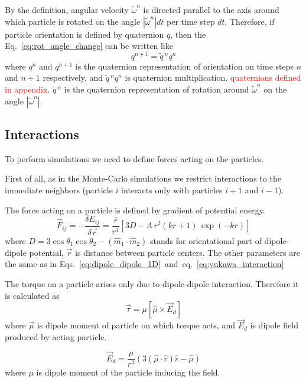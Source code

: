 By the definition, angular velocity $\tilde{\omega}^n$ is directed parallel to the axis around which particle is rotated on the angle $|\tilde{\omega}^n|dt$ per time step $dt$. Therefore, if particle orientation is defined by quaternion $q$, then the Eq.~\eqref{eq:rot_angle_change} can be written like
\begin{equation}
q^{n+1} = \tilde{q}\,^n q^{n}
\end{equation}
where $q^n$ and $q^{n+1}$ is the quaternion representation of orientation on time steps $n$ and $n+1$ respectively, and $\tilde{q}\,^n q^{n}$ is quaternion multiplication. \textcolor{red}{quaternions defined in appendix}. $\tilde{q}\,^n$ is the quaternion representation of rotation around $\tilde{\omega}^n$ on the angle $|\tilde{\omega}^n|$.

\subsection{Interactions}

To perform simulations we need to define forces acting on the particles.

First of all, as in the Monte-Carlo simulations we restrict interactions to the immediate neighbors (particle $i$ interacts only with particles $i+1$ and $i-1$).

The force acting on a particle is defined by gradient of potential energy.
\begin{equation}
\label{eq:full_force}
	\vec{F}_{ij}
		= -\frac{\delta E_{ij}}{\delta \vec{r}}
		=  \frac{\hat{r}}{r^4} \left[3 D - A\, r^2 (k r +1) \, \exp(-k r) \right]
\end{equation}
where $D = 3 \cos \theta_1 \cos \theta_2 - (\hat{m}_1 \cdot \hat{m}_2)$ stands for orientational part of dipole-dipole potential, $\vec{r}$ is distance between particle centers. The other parameters are the same as in Eqs.~\eqref{eq:dipole_dipole_1D}~and~eq.~\eqref{eq:yukawa_interaction}

The torque on a particle arises only due to dipole-dipole interaction. Therefore it is calculated as
\begin{equation}
\label{eq:dipole_torque}
	\vec{\tau}  = \mu[\hat{\mu} \times \vec{E}_d ]
\end{equation}
where $\vec{\mu}$ is dipole moment of particle on which torque acts, and $\vec{E}_d$ is dipole field produced by acting particle.

\begin{equation}
\label{eq:dipole_field}
	\vec{E}_d = \frac{\mu}{r^3}
		\left(3 (\hat{\mu} \cdot \hat{r}) \hat{r} - \hat{\mu} \right)
\end{equation}
where $\mu$ is dipole moment of the particle inducing the field.

